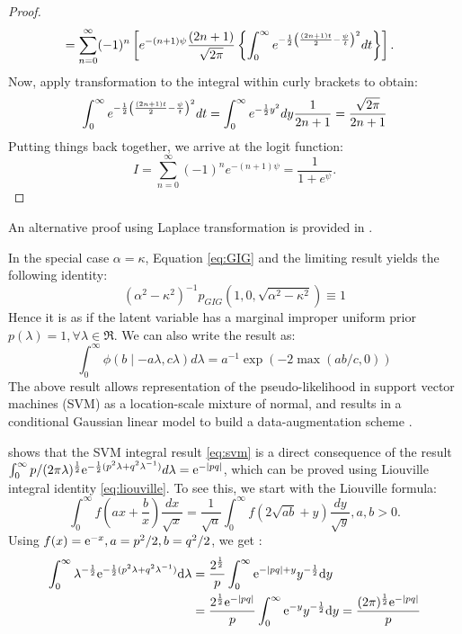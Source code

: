 \documentclass[letterpaper,11pt]{article}
\begin{document}
\begin{proof}
\begin{align*}
& = \sum_{n=0}^{\infty} (-1)^n \left[  e^{-(n+1)\psi} \frac{(2n+1)}{\sqrt{2\pi}} \left\{ \int_{0}^{\infty}e^{-\frac{1}{2} \left( \frac{(2n+1)t}{2} - \frac{\psi}{t}\right)^2 } dt \right\} \right].
\end{align*}
Now, apply \CS transformation to the integral within curly brackets to obtain: 
$$ 
\int_{0}^{\infty}e^{-\frac{1}{2} \left( \frac{(2n+1)t}{2} - \frac{\psi}{t}\right)^2 } dt = \int_0^{\infty} e^{-\frac{1}{2} y^2} dy \frac{1}{2n+1} = \frac{\sqrt{2\pi}}{2n+1}
$$
Putting things back together, we arrive at the logit function: 
$$
I = \sum_{n=0}^{\infty} (-1)^n e^{-(n+1)\psi} = \frac{1}{1+e^{\psi}}.
$$
\end{proof}

An alternative proof using Laplace transformation is provided in \cite{polson2013bayesian}. 
\begin{remark}
In the special case $\alpha = \kappa$, Equation \eqref{eq:GIG} and the limiting result yields the following identity: 
$$
(\alpha^2-\kappa^2)^{-1}p_{GIG}(1,0,\sqrt{\alpha^2-\kappa^2}) \equiv 1
$$
Hence it is as if the latent variable has a marginal improper uniform prior $p(\lambda) = 1, \forall \lambda \in \Re$. We can also write the result as: 
\begin{equation}
  \int_{0}^{\infty} \phi(b \mid -a\lambda, c\lambda) d\lambda = a^{-1} \exp(-2 \max(ab/c,0)) \label{eq:svm}
\end{equation}
The above result allows representation of the pseudo-likelihood in support vector machines (SVM) as a location-scale mixture of normal, and results in a conditional Gaussian linear model to build a data-augmentation scheme \citep{polson2011data}. 
\end{remark}
\citep{polson2011data} shows that the SVM integral result \eqref{eq:svm} is a direct consequence of the \citet{andrews1974scale} result $\int_0^{\infty} p/(2\pi \lambda)^{\frac{1}{2}} {\rm e}^{-\frac{1}{2} (p^2 \lambda+q^2 \lambda^{-1})} d\lambda = {\rm e}^{-|pq|}$, which can be proved using Liouville integral identity \eqref{eq:liouville}. To see this, we start with the Liouville formula:
$$
\int_{0}^{\infty} f\left(ax + \frac{b}{x} \right) \frac{dx}{\sqrt{x}} = \frac{1}{\sqrt{a}} \int_{0}^{\infty} f \left( 2\sqrt{ab} + y \right) \frac{dy}{\sqrt{y}}, a,b >0. 
$$
Using $f(x) = {\rm e}^{-x}, a = p^2/2, b = q^2/2$, we get :
\begin{align*}
\int_0^{\infty} \lambda^{-\frac{1}{2}} {\rm e}^{-\frac{1}{2}(p^2 \lambda + q^2 \lambda^{-1})} {\rm d} \lambda &= \frac{2^{\frac{1}{2}}}{p} \int_0^{\infty} {\rm e}^{-|pq| + y} y^{-\frac{1}{2}} {\rm d} y \\
& =  \frac{2^{\frac{1}{2}} {\rm e}^{-|pq|}}{p} \int_0^{\infty} {\rm e}^{-y} y^{-\frac{1}{2}} {\rm d} y = \frac{(2\pi)^{\frac{1}{2}} {\rm e}^{-|pq|}}{p} 
\end{align*}
\end{document}
